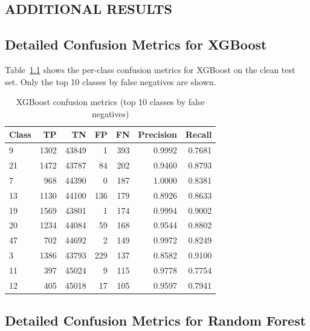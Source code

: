 \documentclass[12pt,a4paper,oneside]{report}
\begin{document}
\begin{appendices}

\chapter{ADDITIONAL RESULTS}

\section{Detailed Confusion Metrics for XGBoost}

Table~\ref{tab:confusion_xgb} shows the per-class confusion metrics for XGBoost on the clean test set. Only the top 10 classes by false negatives are shown.

\begin{table}[H]
    \centering
    \caption[XGBoost confusion metrics (top 10)]{XGBoost confusion metrics (top 10 classes by false negatives)}\label{tab:confusion_xgb}
    \begin{tabular}{lrrrrrr}
        \toprule
        Class & TP & TN & FP & FN & Precision & Recall \\
        \midrule
        9  & 1302 & 43849 & 1   & 393 & 0.9992 & 0.7681 \\
        21 & 1472 & 43787 & 84  & 202 & 0.9460 & 0.8793 \\
        7  & 968  & 44390 & 0   & 187 & 1.0000 & 0.8381 \\
        13 & 1130 & 44100 & 136 & 179 & 0.8926 & 0.8633 \\
        19 & 1569 & 43801 & 1   & 174 & 0.9994 & 0.9002 \\
        20 & 1234 & 44084 & 59  & 168 & 0.9544 & 0.8802 \\
        47 & 702  & 44692 & 2   & 149 & 0.9972 & 0.8249 \\
        3  & 1386 & 43793 & 229 & 137 & 0.8582 & 0.9100 \\
        11 & 397  & 45024 & 9   & 115 & 0.9778 & 0.7754 \\
        12 & 405  & 45018 & 17  & 105 & 0.9597 & 0.7941 \\
        \bottomrule
    \end{tabular}
\end{table}

\section{Detailed Confusion Metrics for Random Forest}


\end{appendices}
\end{document}
